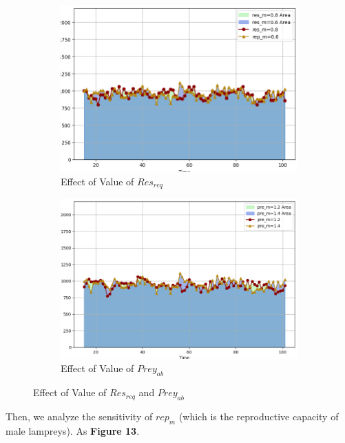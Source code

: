\documentclass{mcmthesis}
\begin{document}
\begin{figure}[H]
  \centering
  \begin{subfigure}[b]{0.45\textwidth}
    \includegraphics[width=\textwidth]{figures/7_1_figur1.png}
    \caption{Effect of Value of $Res_{req}$}
    \label{fig:sub1}
  \end{subfigure}
  \hfill
  \begin{subfigure}[b]{0.47\textwidth}
    \includegraphics[width=\textwidth]{figures/7_1_figur2.png}
    \caption{Effect of Value of $Prey_{ab}$}
    \label{fig:sub2}
  \end{subfigure}

  \caption{ Effect of Value of $Res_{req}$ and $Prey_{ab}$}
  \label{fig:Simulation of Disaster}
\end{figure}

Then, we analyze the sensitivity of $rep_m$ (which is the reproductive capacity of male lampreys).  As \textbf{Figure 13}.
\end{document}
